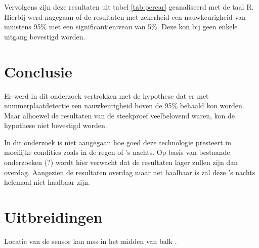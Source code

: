 Vervolgens zijn deze resultaten uit tabel \ref{tab:percar} geanaliseerd met de taal R. Hierbij werd nagegaan of de resultaten met zekerheid een nauwkeurigheid van minstens 95\% met een significantieniveau van 5\%. Deze kon bij geen enkele uitgang bevestigd worden.

\section{Conclusie}
Er werd in dit onderzoek vertrokken met de hypothese dat er met nummerplaatdetectie een nauwkeurigheid boven de 95\% behaald kon worden. Maar alhoewel de resultaten van de steekproef veelbelovend waren, kon de hypothese niet bevestigd worden.

In dit onderzoek is niet aangegaan hoe goed deze technologie presteert in moeilijke condities zoals in de regen of 's nachts. Op basis van bestaande onderzoeken (?) wordt hier verwacht dat de resultaten lager zullen zijn dan overdag. Aangezien de resultaten overdag maar net haalbaar is zal deze 's nachts helemaal niet haalbaar zijn.

\section{Uitbreidingen}
Locatie van de sensor kan mss in het midden van balk \autocite{buhus2016automatic}.
